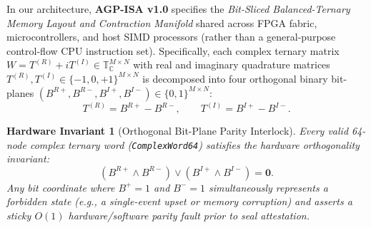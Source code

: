\documentclass[10pt, twocolumn, a4paper]{article}
\newtheorem{invariant}{Hardware Invariant}
\begin{document}
In our architecture, \textbf{AGP-ISA v1.0} specifies the \textit{Bit-Sliced Balanced-Ternary Memory Layout and Contraction Manifold} shared across FPGA fabric, microcontrollers, and host SIMD processors (rather than a general-purpose control-flow CPU instruction set). Specifically, each complex ternary matrix $W = T^{(R)} + i T^{(I)} \in \mathbb{T}_{\mathbb{C}}^{M \times N}$ with real and imaginary quadrature matrices $T^{(R)}, T^{(I)} \in \{-1, 0, +1\}^{M \times N}$ is decomposed into four orthogonal binary bit-planes $(B^{R+}, B^{R-}, B^{I+}, B^{I-}) \in \{0, 1\}^{M \times N}$:
\begin{equation}
T^{(R)} = B^{R+} - B^{R-}, \qquad T^{(I)} = B^{I+} - B^{I-}.
\label{eq:bitplane_decomp}
\end{equation}

\begin{invariant}[Orthogonal Bit-Plane Parity Interlock]
\label{inv:parity}
Every valid 64-node complex ternary word (\texttt{ComplexWord64}) satisfies the hardware orthogonality invariant:
\begin{equation}
\left(B^{R+} \land B^{R-}\right) \lor \left(B^{I+} \land B^{I-}\right) = \mathbf{0}.
\label{eq:parity_invariant}
\end{equation}
Any bit coordinate where $B^+ = 1$ and $B^- = 1$ simultaneously represents a forbidden state (e.g., a single-event upset or memory corruption) and asserts a sticky $O(1)$ hardware/software parity fault prior to seal attestation.
\end{invariant}
\end{document}

